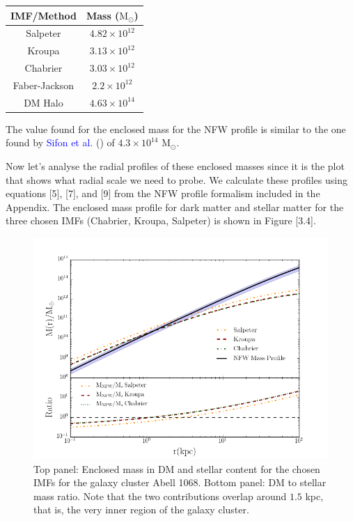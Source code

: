 \begin{center}
\begin{tabular}{c c}
IMF/Method & Mass ($\text{M}_{\odot}$)\tabularnewline
\hline 
\hline
Salpeter & $4.82\times10^{12}$\tabularnewline
Kroupa & $3.13\times10^{12}$\tabularnewline
Chabrier & $3.03\times10^{12}$\tabularnewline
Faber-Jackson & $2.2\times10^{12}$\tabularnewline
DM Halo & $4.63\times10^{14}$\tabularnewline
\end{tabular}
\end{center}

The value found for the enclosed mass for the NFW profile is similar to the one found by \textcolor{blue}{Sifon et al.} (\citeyear{Reference9}) of $4.3\times 10^{14}$ $\text{M}_{\odot}$.

Now let's analyse the radial profiles of these enclosed masses since it is the plot that shows what radial scale we need to probe. We calculate these profiles using equations [5], [7], and [9] from the NFW profile formalism included in the Appendix. The enclosed mass profile for dark matter and stellar matter for the three chosen IMFs (Chabrier, Kroupa, Salpeter) is shown in Figure [3.4].

\begin{figure}[H]
\centering
\includegraphics[width=12cm]{images/DM_fraction_all_IMFs.png}
\caption[Enclosed mass and DM to stellar mass ratio for a galaxy cluster]{Top panel: Enclosed mass in DM and stellar content for the chosen IMFs for the galaxy cluster Abell 1068. Bottom panel: DM to stellar mass ratio. Note that the two contributions overlap around $1.5 $ kpc, that is, the very inner region of the galaxy cluster.}
\end{figure}


